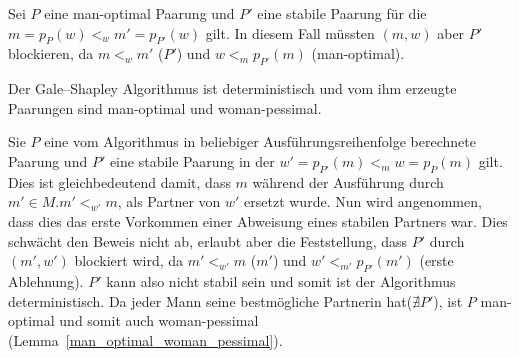 \begin{Beweis}
\label{man_optimal_woman_pessimal_bew}
  Sei $P$ eine man-optimal Paarung und $P'$ eine stabile Paarung für die $m = p_{P}(w) <_{w} m' = p_{P'}(w)$ gilt. In diesem Fall müssten $(m,w)$ aber $P'$ blockieren, da $m <_{w} m'$ ($P'$) und $w <_{m} p_{P'}(m)$ (man-optimal).
\end{Beweis}

\begin{Theorem}
\label{mann_optimal}
  Der Gale–Shapley Algorithmus ist deterministisch und vom ihm erzeugte Paarungen sind man-optimal und woman-pessimal.
\end{Theorem}

\begin{Beweis}
\label{mann_optimal_bew}
  Sie $P$ eine vom Algorithmus in beliebiger Ausführungsreihenfolge berechnete Paarung und $P'$ eine stabile Paarung in der $w' = p_{P'}(m) <_{m} w = p_{P}(m)$ gilt. Dies ist gleichbedeutend damit, dass $m$ während der Ausführung durch $m' \in M.m' <_{w'} m$, als Partner von $w'$ ersetzt wurde. Nun wird angenommen, dass dies das erste Vorkommen einer Abweisung eines stabilen Partners war. Dies schwächt den Beweis nicht ab, erlaubt aber die Feststellung, dass $P'$ durch $(m',w')$ blockiert wird, da $m' <_{w'} m$ ($m'$) und $w' <_{m'} p_{P'}(m')$ (erste Ablehnung). $P'$ kann also nicht stabil sein und somit ist der Algorithmus deterministisch. Da jeder Mann seine bestmögliche Partnerin hat($\nexists P'$), ist $P$ man-optimal und somit auch woman-pessimal (Lemma~\ref{man_optimal_woman_pessimal}).
\end{Beweis}
